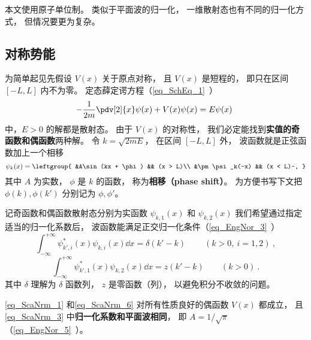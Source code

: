 
\begin{issues}
\issueTODO
\end{issues}

本文使用原子单位制。 类似于平面波的归一化， 一维散射态也有不同的归一化方式， 但情况要更为复杂。

\subsection{对称势能}
为简单起见先假设 $V(x)$ 关于原点对称， 且 $V(x)$ 是短程的， 即只在区间 $[-L,L]$ 内不为零。 定态薛定谔方程（\autoref{eq_SchEq_1}~）
\begin{equation}
-\frac{1}{2m}\pdv[2]{x}\psi(x) + V(x)\psi(x) = E\psi(x)~
\end{equation}
中，$E > 0$ 的解都是散射态。 由于 $V(x)$ 的对称性， 我们必定能找到\textbf{实值的奇函数和偶函数}两种解。 令 $k = \sqrt{2mE}$， 在区间 $[-L,L]$ 外， 波函数就是正弦函数加上一个相移
\begin{equation}\label{eq_ScaNrm_3}
\psi_k(x) = \leftgroup{
&A\sin(kx + \phi) && (x > L)\\
&\pm \psi_k(-x) && (x < L)~,
}\end{equation}
其中 $A$ 为实数， $\phi$ 是 $k$ 的函数， 称为\textbf{相移（phase shift）}。 为方便书写下文把 $\phi(k),\phi(k')$ 分别记为 $\phi, \phi'$。

记奇函数和偶函数散射态分别为实函数 $\psi_{k,1}(x)$ 和 $\psi_{k,2}(x)$ 我们希望通过指定适当的归一化系数后， 波函数能满足正交归一化条件（\autoref{eq_EngNor_3}~）
\begin{equation}\label{eq_ScaNrm_1}
\int_{-\infty}^{+\infty} \psi_{k',i}^*(x) \psi_{k,i}(x) \dd{x} = \delta(k' - k)~\qquad (k > 0,\ i = 1, 2)~,
\end{equation}
\begin{equation}\label{eq_ScaNrm_6}
\int_{-\infty}^{+\infty} \psi_{k',1}^*(x) \psi_{k,2}(x) \dd{x} = z(k' - k) \qquad (k > 0)~.
\end{equation}
其中 $\delta$ 理解为 $\delta$ 函数列， $z$ 是零函数（列）， 以避免积分不收敛的问题。

\begin{theorem}{}\label{the_ScaNrm_1}
\autoref{eq_ScaNrm_1} 和\autoref{eq_ScaNrm_6} 对所有性质良好的偶函数 $V(x)$ 都成立， 且\autoref{eq_ScaNrm_3} 中\textbf{归一化系数和平面波相同}， 即 $A = 1/\sqrt{\pi}$（\autoref{eq_EngNor_5}~）。
\end{theorem}

